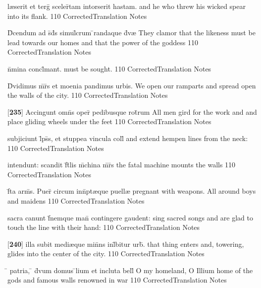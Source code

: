 \latline
  {l{\ae}serit et terg\={} sceler\={}tam intorserit hastam.}
  { and he who threw his wicked spear into its flank. }
  {110}
  { CorrectedTranslation }
  { Notes }


\latline
  {D\={}cendum ad s\={}d\={}s simul\={}crum \={}randaque d\={\macron {\i}}v{\ae}}
  { They clamor that the likeness must be lead towards our homes and that the power of the goddess  }
  {110}
  { CorrectedTranslation }
  { Notes }


\latline
  {n\={}mina concl\={}mant.}
  { must be sought. }
  {110}
  { CorrectedTranslation }
  { Notes }


\latline
  {D\={\macron {\i}}vidimus m\={}r\={}s et moenia pandimus urbis.}
  { We open our ramparts and spread open the walls of the city. }
  {110}
  { CorrectedTranslation }
  { Notes }


\latline
  {[\textbf{235}] Accingunt omn\={}s oper\={\macron {\i}} pedibusque rot\={}rum}
  { All men gird for the work and and place gliding wheels under the feet  }
  {110}
  { CorrectedTranslation }
  { Notes }


\latline
  {subjiciunt l\={}ps\={}s, et stuppea vincula coll\={}}
  { and extend hempen lines from the neck: }
  {110}
  { CorrectedTranslation }
  { Notes }


\latline
  {intendunt: scandit f\={}t\={}lis m\={}china m\={}r\={}s}
  { the fatal machine mounts the walls  }
  {110}
  { CorrectedTranslation }
  { Notes }


\latline
  {f\={}ta arm\={\macron {\i}}s.  Puer\={\macron {\i}} circum inn\={}pt{\ae}que puell{\ae}}
  { pregnant with weapons.  All around boys and maidens }
  {110}
  { CorrectedTranslation }
  { Notes }


\latline
  {sacra canunt f\={}nemque man\={} contingere gaudent:}
  { sing sacred songs and are glad to touch the line with their hand: }
  {110}
  { CorrectedTranslation }
  { Notes }


\latline
  {[\textbf{240}] illa subit medi{\ae}que min\={}ns inl\={}bitur urb\={\macron {\i}}.}
  { that thing enters and, towering, glides into the center of the city. }
  {110}
  { CorrectedTranslation }
  { Notes }


\latline
  {\={} patria, \={} d\={\macron {\i}}vum domus \={}lium et incluta bell\={}}
  { O my homeland, O Illium home of the gods and famous walls renowned in war }
  {110}
  { CorrectedTranslation }
  { Notes }


